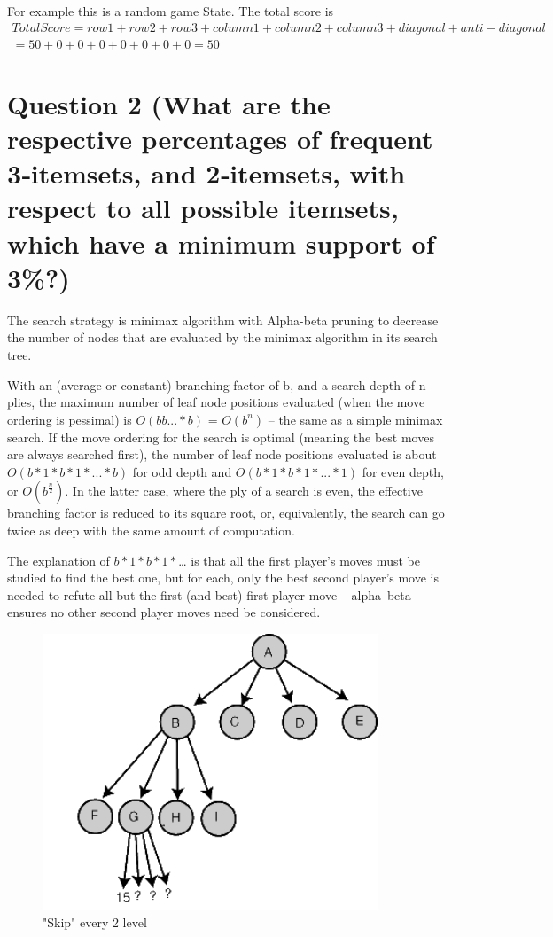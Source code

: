 \documentclass[titlepage]{article}
\begin{document}
For example this is a random game State. The total score is
\begin{multline}
   Total Score = row1 + row2 + row3 + column1 + column2 + column3 + diagonal +
anti-diagonal \\
               = 50 + 0 + 0 + 0 + 0 + 0 + 0 + 0 = 50
\end{multline}

\section{Question 2 (What are the respective percentages of frequent 3‐itemsets, and 2‐itemsets, with respect to all possible itemsets, which have a minimum support of 3\%?)}
\label{sec:org691986d}

The search strategy is minimax algorithm with Alpha-beta pruning to decrease
the number of nodes that are evaluated by the minimax algorithm in its search
tree.

With an (average or constant) branching factor of b, and a search depth of n
plies, the maximum number of leaf node positions evaluated (when the move
ordering is pessimal) is \(O(bb...*b)\) = \(O(b^n)\) – the same as a simple minimax
search. If the move ordering for the search is optimal (meaning the best moves
are always searched first), the number of leaf node positions evaluated is
about \(O(b*1*b*1*...*b)\) for odd depth and \(O(b*1*b*1*...*1)\) for even depth, or
\(O(b^\frac{n}{2})\). In the latter case, where the ply of a search is even, the
effective branching factor is reduced to its square root, or, equivalently,
the search can go twice as deep with the same amount of computation.

The explanation of \(b*1*b*1*\)\ldots{} is that all the first player's moves must be
studied to find the best one, but for each, only the best second player's move
is needed to refute all but the first (and best) first player move – alpha–beta
ensures no other second player moves need be considered.

\begin{figure}[htbp]
\caption{\label{fig:org0bcf242}
"Skip" every 2 level}
\centering
\includegraphics[width=10cm]{./img/alpha.png}
\end{figure}
\end{document}
